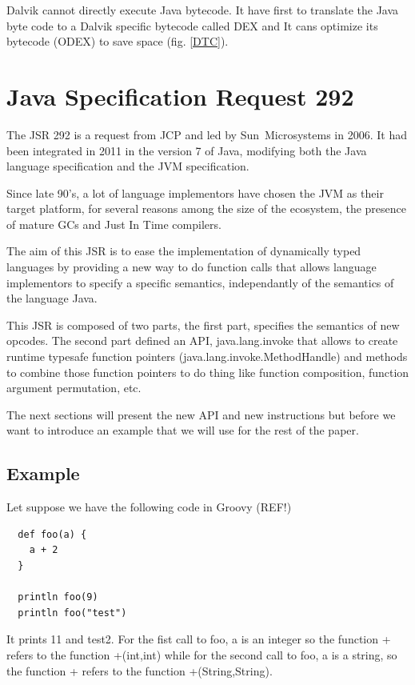 \documentclass{sigplanconf}
\def \JCP{JCP\xspace}
\def \SUN{\mbox{Sun Microsystems}\xspace}
\def \DALVIK{\mbox{Dalvik}\xspace}
\def \Jsr{JSR\xspace}
\def \JSR{\Jsr 292\xspace}
\def \JVM{JVM\xspace}
\def \DEX{\mbox{DEX}\xspace}
\begin{document}
      \DALVIK cannot directly execute Java bytecode.
      It have first to translate the Java byte code to a \DALVIK specific bytecode called \DEX
      and It cans optimize its bytecode (\mbox{ODEX}) to save space (fig. \ref{DTC}).

  \section{Java Specification Request 292}

    The \JSR is a request from \JCP and led by \SUN in 2006.
    It had been integrated in 2011 in the version 7 of Java,
    modifying both the Java language specification and the \JVM specification.

    Since late 90's, a lot of language \cite{wiki-jvm-lang}
    implementors have chosen the JVM as their target platform,
    for several reasons among the size of the ecosystem,
    the presence of mature GCs and Just In Time compilers. 

    The aim of this \Jsr is to ease the implementation of dynamically typed languages
    by providing a new way to do function calls that allows language implementors
    to specify a specific semantics, independantly of the semantics of the language Java.
    
    This \Jsr is composed of two parts, the first part, specifies the semantics of
    new opcodes. The second part defined an API, java.lang.invoke that allows
    to create runtime typesafe function pointers (java.lang.invoke.MethodHandle) and
    methods to combine those function pointers to do thing like function composition,
    function argument permutation, etc.

    The next sections will present the new API and new instructions but before
    we want to introduce an example that we will use for the rest of the paper.

    \subsection{Example}
      Let suppose we have the following code in Groovy (REF!)
      
      {\tiny      
      \begin{verbatim}
  def foo(a) {
    a + 2
  }

  println foo(9)
  println foo("test")
      \end{verbatim}
      }

      It prints 11 and test2. For the fist call to foo, a is an integer so the function + refers
      to the function +(int,int) while for the second call to foo, a is a string, so the
      function + refers to the function +(String,String).
\end{document}
